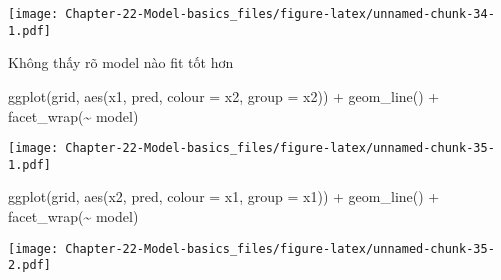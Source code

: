 \documentclass[
]{article}
\newenvironment{Shaded}{\begin{snugshade}}{\end{snugshade}}
\newcommand{\AttributeTok}[1]{\textcolor[rgb]{0.77,0.63,0.00}{#1}}
\newcommand{\FunctionTok}[1]{\textcolor[rgb]{0.00,0.00,0.00}{#1}}
\newcommand{\NormalTok}[1]{#1}
\newcommand{\SpecialCharTok}[1]{\textcolor[rgb]{0.00,0.00,0.00}{#1}}
\begin{document}
\texttt{[image: Chapter-22-Model-basics\_files/figure-latex/unnamed-chunk-34-1.pdf]}

Không thấy rõ model nào fit tốt hơn

\begin{Shaded}
\begin{Highlighting}[]
\FunctionTok{ggplot}\NormalTok{(grid, }\FunctionTok{aes}\NormalTok{(x1, pred, }\AttributeTok{colour =}\NormalTok{ x2, }\AttributeTok{group =}\NormalTok{ x2)) }\SpecialCharTok{+} 
  \FunctionTok{geom\_line}\NormalTok{() }\SpecialCharTok{+}
  \FunctionTok{facet\_wrap}\NormalTok{(}\SpecialCharTok{\textasciitilde{}}\NormalTok{ model)}
\end{Highlighting}
\end{Shaded}

\texttt{[image: Chapter-22-Model-basics\_files/figure-latex/unnamed-chunk-35-1.pdf]}

\begin{Shaded}
\begin{Highlighting}[]
\FunctionTok{ggplot}\NormalTok{(grid, }\FunctionTok{aes}\NormalTok{(x2, pred, }\AttributeTok{colour =}\NormalTok{ x1, }\AttributeTok{group =}\NormalTok{ x1)) }\SpecialCharTok{+} 
  \FunctionTok{geom\_line}\NormalTok{() }\SpecialCharTok{+}
  \FunctionTok{facet\_wrap}\NormalTok{(}\SpecialCharTok{\textasciitilde{}}\NormalTok{ model)}
\end{Highlighting}
\end{Shaded}

\texttt{[image: Chapter-22-Model-basics\_files/figure-latex/unnamed-chunk-35-2.pdf]}
\end{document}
